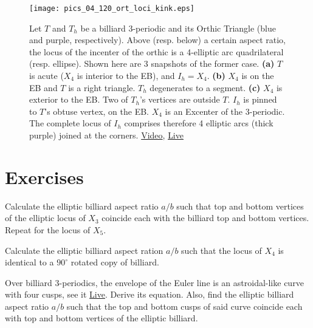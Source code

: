 \begin{figure}
    \centering
    \texttt{[image: pics\_04\_120\_ort\_loci\_kink.eps]}
    \caption{Let $T$ and $T_h$ be a billiard 3-periodic and its Orthic Triangle (blue and purple, respectively). Above (resp. below) a certain aspect ratio, the locus of the incenter of the orthic is a 4-elliptic arc quadrilateral (resp. ellipse). Shown here are 3 snapshots of the former case. \textbf{(a)} $T$ is acute ($X_4$ is interior to the EB), and $I_h=X_4$. \textbf{(b)} $X_4$ is on the EB and $T$ is a right triangle. $T_h$ degenerates to a segment. \textbf{(c)} $X_4$ is exterior to the EB. Two of $T_h$'s vertices are outside $T$. $I_h$ is pinned to $T$'s obtuse vertex, on the EB. $X_4$ is an Excenter of the 3-periodic. The complete locus of $I_h$ comprises therefore 4 elliptic arcs (thick purple) joined at the corners. \href{https://youtu.be/3qJnwpFkUFQ}{Video}, \href{https://bit.ly/33TVjit}{Live}}
    \label{fig:orthic_incenter_locus}
\end{figure}

\section{Exercises}

\begin{exercise}
Calculate the elliptic billiard aspect ratio $a/b$ such that top and bottom vertices of the elliptic locus of $X_3$ coincide each with the billiard top and bottom vertices. Repeat for the locus of $X_5$.
\end{exercise}

\begin{exercise}
Calculate the elliptic billiard aspect ration $a/b$ such that the locus of $X_4$ is identical to a $90^\circ$ rotated copy of billiard.
\end{exercise}

\begin{exercise}
Over billiard 3-periodics, the envelope of the Euler line is an astroidal-like curve with four cusps, see it \href{https://bit.ly/3yiCvrn}{Live}. Derive its equation. Also, find the elliptic billiard aspect ratio $a/b$ such that the top and bottom cusps of said curve coincide each with top and bottom vertices of the elliptic billiard.
\end{exercise}